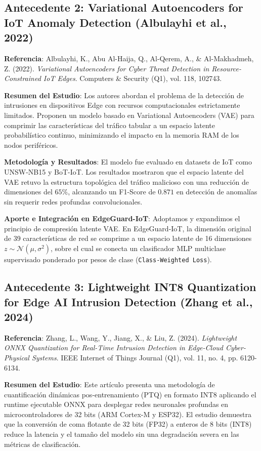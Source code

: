 \subsection{Antecedente 2: Variational Autoencoders for IoT Anomaly Detection (Albulayhi et al., 2022)}
\textbf{Referencia}: Albulayhi, K., Abu Al-Haija, Q., Al-Qerem, A., \& Al-Makhadmeh, Z. (2022). \textit{Variational Autoencoders for Cyber Threat Detection in Resource-Constrained IoT Edges}. Computers \& Security (Q1), vol. 118, 102743.

\textbf{Resumen del Estudio}:
Los autores abordan el problema de la detección de intrusiones en dispositivos Edge con recursos computacionales estrictamente limitados. Proponen un modelo basado en Variational Autoencoders (VAE) para comprimir las características del tráfico tabular a un espacio latente probabilístico continuo, minimizando el impacto en la memoria RAM de los nodos periféricos.

\textbf{Metodología y Resultados}:
El modelo fue evaluado en datasets de IoT como UNSW-NB15 y BoT-IoT. Los resultados mostraron que el espacio latente del VAE retuvo la estructura topológica del tráfico malicioso con una reducción de dimensiones del $65\%$, alcanzando un F1-Score de $0.871$ en detección de anomalías sin requerir redes profundas convolucionales.

\textbf{Aporte e Integración en EdgeGuard-IoT}:
Adoptamos y expandimos el principio de compresión latente VAE. En EdgeGuard-IoT, la dimensión original de 39 características de red se comprime a un espacio latente de 16 dimensiones $z \sim \mathcal{N}(\mu, \sigma^2)$, sobre el cual se conecta un clasificador MLP multiclase supervisado ponderado por pesos de clase (\texttt{Class-Weighted Loss}).

\subsection{Antecedente 3: Lightweight INT8 Quantization for Edge AI Intrusion Detection (Zhang et al., 2024)}
\textbf{Referencia}: Zhang, L., Wang, Y., Jiang, X., \& Liu, Z. (2024). \textit{Lightweight ONNX Quantization for Real-Time Intrusion Detection in Edge-Cloud Cyber-Physical Systems}. IEEE Internet of Things Journal (Q1), vol. 11, no. 4, pp. 6120-6134.

\textbf{Resumen del Estudio}:
Este artículo presenta una metodología de cuantificación dinámicas pos-entrenamiento (PTQ) en formato INT8 aplicando el runtime ejecutable ONNX para desplegar redes neuronales profundas en microcontroladores de 32 bits (ARM Cortex-M y ESP32). El estudio demuestra que la conversión de coma flotante de 32 bits (FP32) a enteros de 8 bits (INT8) reduce la latencia y el tamaño del modelo sin una degradación severa en las métricas de clasificación.

